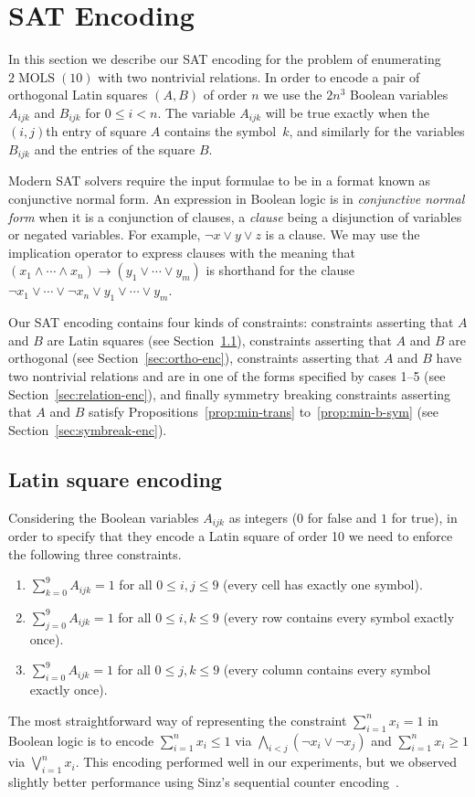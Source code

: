 \documentclass[runningheads]{llncs}
\newcommand{\limp}{\mathbin\rightarrow}
\newcommand{\MOLS}[2]{#1\operatorname{MOLS}(#2)}
\begin{document}
\section{SAT Encoding}\label{sec:encoding}

In this section we describe our SAT encoding for the problem
of enumerating $\MOLS{2}{10}$ with two nontrivial relations.
In order to encode a pair of orthogonal Latin squares $(A,B)$
of order $n$ we use the $2n^3$ Boolean variables $A_{ijk}$ and
$B_{ijk}$ for $0\leq i<n$.  The variable $A_{ijk}$ will be true exactly when
the $(i,j)$th entry of square $A$ contains the symbol~$k$, and
similarly for the variables $B_{ijk}$ and the entries of the square $B$.

Modern SAT solvers require the input formulae to be in a format
known as conjunctive normal form.  An expression in Boolean logic
is in \emph{conjunctive normal form} when it is a conjunction of clauses,
a \emph{clause} being a disjunction of variables or negated variables.
For example, $\lnot x\lor y\lor z$ is a clause.
We may use the implication operator to express clauses
with the meaning that $(x_1\land\dotsb\land x_n)\limp(y_1\lor\dotsb\lor y_m)$
is shorthand for the clause $\lnot x_1\lor\dotsb\lor\lnot x_n\lor y_1\lor\dotsb\lor y_m$.

Our SAT encoding contains four kinds of constraints:
constraints asserting that $A$ and $B$ are Latin squares (see Section~\ref{sec:latin-enc}),
constraints asserting that $A$ and $B$ are orthogonal (see Section~\ref{sec:ortho-enc}),
constraints asserting that $A$ and $B$ have two nontrivial relations
and are in one of the forms specified by cases 1--5 (see Section~\ref{sec:relation-enc}),
and finally symmetry breaking constraints asserting that $A$ and $B$ satisfy
Propositions~\ref{prop:min-trans} to~\ref{prop:min-b-sym} (see Section~\ref{sec:symbreak-enc}).

\subsection{Latin square encoding}\label{sec:latin-enc}

Considering the Boolean variables $A_{ijk}$ as integers ($0$ for false
and $1$ for true), in order to specify that they encode a Latin square of order 10 we
need to enforce the following three constraints.
\begin{enumerate}
\item $\sum_{k=0}^{9} A_{ijk}=1$ for all $0\leq i,j\leq 9$ (every cell has exactly one symbol).
\item $\sum_{j=0}^{9} A_{ijk}=1$ for all $0\leq i,k\leq 9$ (every row contains every symbol exactly once).
\item $\sum_{i=0}^{9} A_{ijk}=1$ for all $0\leq j,k\leq 9$ (every column contains every symbol exactly once).
\end{enumerate}
The most straightforward
way of representing the constraint $\sum_{i=1}^{n}x_i=1$ in Boolean logic is to encode
$\sum_{i=1}^{n}x_i\leq 1$ via $\bigwedge_{i<j}(\lnot x_i\lor\lnot x_j)$
and $\sum_{i=1}^{n}x_i\geq 1$ via $\bigvee_{i=1}^{n} x_i$.
This encoding performed well in our experiments, but
we observed slightly better performance using Sinz's sequential counter encoding~\cite{sinz2005towards}.
\end{document}
